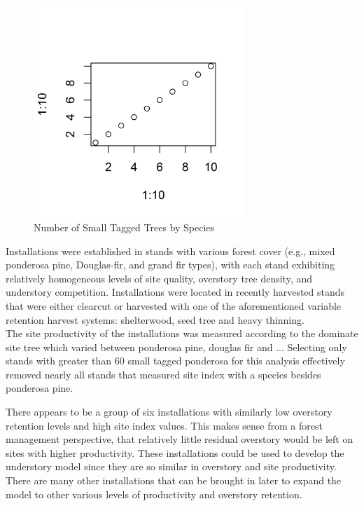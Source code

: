 \documentclass[11pt, letterpaper, fleqn]{article}
\begin{document}
\begin{figure}[h]
\begin{center}
\includegraphics[width=80mm]{species}
\caption{Number of Small Tagged Trees by Species}
\label{fig:st_by_spec}
\end{center}
\end{figure}


Installations were established in stands with various forest cover (e.g., mixed ponderosa pine, Douglas-fir, and grand fir types), with each stand exhibiting relatively homogeneous levels of site quality, overstory tree density, and understory competition.  Installations were located in recently harvested stands that were either clearcut or harvested with one of the aforementioned variable retention harvest systems: shelterwood, seed tree and heavy thinning. \\[2pt]


The site productivity of the installations was measured according to the dominate site tree which varied between ponderosa pine, douglas fir and ... Selecting only stands with greater than 60 small tagged ponderosa for this analysis effectively removed nearly all stands that measured site index with a species besides ponderosa pine.

There appears to be a group of six installations with similarly low overstory retention levels and high site index values.  This makes sense from a forest management perspective, that relatively little residual overstory would be left on sites with higher productivity.  These installations could be used to develop the understory model since they are so similar in overstory and site productivity. There are many other installations that can be brought in later to expand the model to other various levels of productivity and overstory retention.
\end{document}
